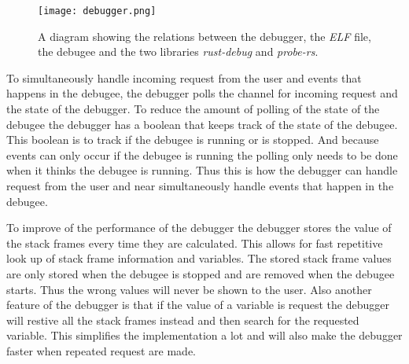 \begin{figure}[h]
	\centering
	\texttt{[image: debugger.png]}
	\caption{A diagram showing the relations between the debugger, the \emph{ELF} file, the \gls{debugee} and the two libraries \emph{rust-debug} and \emph{probe-rs}.}
	\label{fig:debugger}
\end{figure}


To simultaneously handle incoming request from the user and events that happens in the \gls{debugee}, the debugger polls the channel for incoming request and the state of the debugger.
To reduce the amount of polling of the state of the \gls{debugee} the debugger has a boolean that keeps track of the state of the \gls{debugee}.
This boolean is to track if the \gls{debugee} is running or is stopped.
And because events can only occur if the \gls{debugee} is running the polling only needs to be done when it thinks the \gls{debugee} is running.
Thus this is how the debugger can handle request from the user and near simultaneously handle events that happen in the \gls{debugee}.


To improve of the performance of the debugger the debugger stores the value of the stack frames every time they are calculated.
This allows for fast repetitive look up of stack frame information and variables.
The stored stack frame values are only stored when the \gls{debugee} is stopped and are removed when the \gls{debugee} starts.
Thus the wrong values will never be shown to the user.
Also another feature of the debugger is that if the value of a variable is request the debugger will restive all the stack frames instead and then search for the requested variable.
This simplifies the implementation a lot and will also make the debugger faster when repeated request are made.

